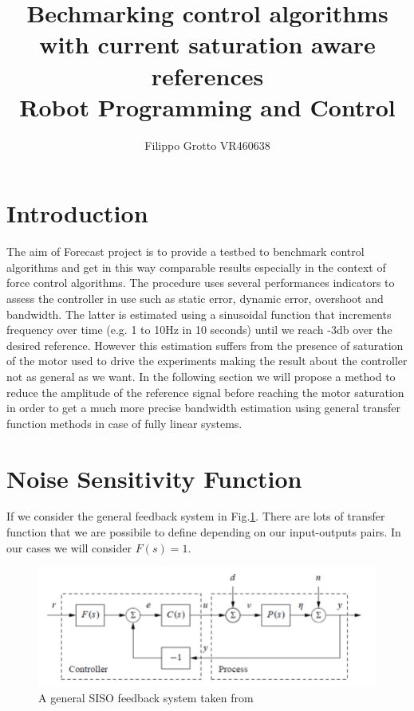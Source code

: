 \documentclass[a4paper,11pt]{article}
\begin{document}
\author{Filippo Grotto VR460638}

\title{Bechmarking control algorithms with current saturation aware references \\[1ex] \large Robot Programming and Control}

\maketitle
\tableofcontents

\section{Introduction}
The aim of Forecast project \cite{Forecast} is to provide a testbed to benchmark control algorithms and get in this way comparable results especially in the context of force control algorithms. The procedure uses several performances indicators to assess the controller in use such as static error, dynamic error, overshoot and bandwidth. The latter is estimated using a sinusoidal function that increments frequency over time (e.g. 1 to 10Hz in 10 seconds) until we reach -3db over the desired reference. However this estimation suffers from the presence of saturation of the motor used to drive the experiments making the result about the controller not as general as we want. In the following section we will propose a method to reduce the amplitude of the reference signal before reaching the motor saturation in order to get a much more precise bandwidth estimation using general transfer function methods in case of fully linear systems.

\newpage
\section{Noise Sensitivity Function}
If we consider the general feedback system in Fig.\ref{fig:feedback}. There are lots of transfer function that we are possibile to define depending on our input-outputs pairs. In our cases we will consider $F(s)=1$. 

\begin{figure}[H]
\begin{center}
\includegraphics[width=1.0\textwidth]{images/feedback.png}
\end{center}
\caption{A general SISO feedback system taken from \cite{scientist}}
\label{fig:feedback}
\end{figure}
\end{document}
